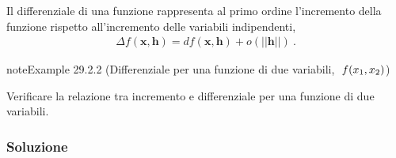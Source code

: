 \documentclass[letterpaper,10pt,italian]{jupyterBook}
\begin{document}
\sphinxAtStartPar
Il differenziale di una funzione rappresenta al primo ordine l’incremento della funzione rispetto all’incremento delle variabili indipendenti,
\begin{equation*}
\begin{split} \Delta f(\mathbf{x}, \mathbf{h}) = df(\mathbf{x}, \mathbf{h}) + o(||\mathbf{h}||)\ .\end{split}
\end{equation*}\label{ch/multivariable-calculus/derivatives:multivariable-calculus:differential}
\begin{sphinxadmonition}{note}{Example 29.2.2 (Differenziale per una funzione di due variabili, \protect\(\ f(x_1, x_2) \protect\))}



\sphinxAtStartPar
Verificare la relazione tra incremento e differenziale per una funzione di due variabili.
\subsubsection*{Soluzione}


\end{sphinxadmonition}
\end{document}
